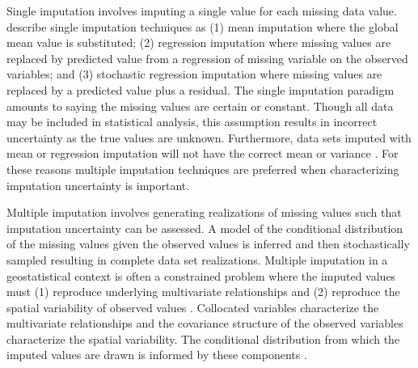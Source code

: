 Single imputation involves imputing a single value for each missing data value. \cite{little2019statistical} describe single imputation techniques as (1) mean imputation where the global mean value is substituted; (2) regression imputation where missing values are replaced by predicted value from a regression of missing variable on the observed variables; and (3) stochastic regression imputation where missing values are replaced by a predicted value plus a residual. The single imputation paradigm amounts to saying the missing values are certain or constant. Though all data may be included in statistical analysis, this assumption results in incorrect uncertainty as the true values are unknown. Furthermore, data sets imputed with mean or regression imputation will not have the correct mean or variance \citep{barnett2015multivariate}. For these reasons multiple imputation techniques are preferred when characterizing imputation uncertainty is important.

Multiple imputation involves generating realizations of missing values such that imputation uncertainty can be assessed. A model of the conditional distribution of the missing values given the observed values is inferred and then stochastically sampled resulting in complete data set realizations. Multiple imputation in a geostatistical context is often a constrained problem where the imputed values must (1) reproduce underlying multivariate relationships and (2) reproduce the spatial variability of observed values \citep{barnett2015multivariate}. Collocated variables characterize the multivariate relationships and the covariance structure of the observed variables characterize the spatial variability. The conditional distribution from which the imputed values are drawn is informed by these components \citep{hadavand2023spatial}.

